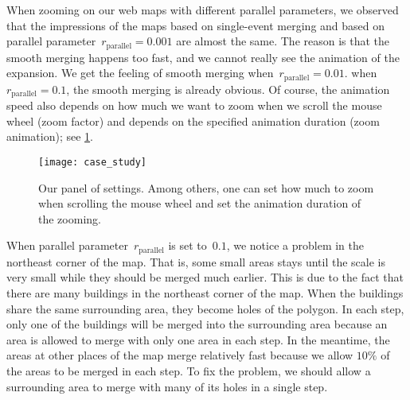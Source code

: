 \documentclass[ijgi,article,submit,moreauthors,pdftex]{Definitions/mdpi}
\begin{document}
\begin{table}[tb]
\label{tbl:parallel_param_comparison}
\end{table}

When zooming on our web maps with different parallel parameters,
we observed that the impressions of the maps 
based on single-event merging and based on parallel parameter~$r_\mathrm{parallel}= 0.001$ are almost the same.
The reason is that the smooth merging happens too fast,
and we cannot really see the animation of the expansion.
We get the feeling of smooth merging when~$r_\mathrm{parallel}= 0.01$.
when~$r_\mathrm{parallel}= 0.1$, the smooth merging is already obvious.
Of course, the animation speed also depends on how much we want to zoom
when we scroll the mouse wheel (zoom factor) 
and depends on the specified animation duration (zoom animation);
see \fig\ref{fig:interaction_settings}.


\begin{figure}[tb]
\centering
\texttt{[image: case\_study]}
\caption{Our panel of settings. 
Among others, one can set how much to zoom when scrolling the mouse wheel 
and set the animation duration of the zooming.}
\label{fig:interaction_settings}
\end{figure}

When parallel parameter~$r_\mathrm{parallel}$ is set to~$0.1$,
we notice a problem in the northeast corner of the map.
That is, some small areas stays until the scale is very small
while they should be merged much earlier.
This is due to the fact that 
there are many buildings in the northeast corner of the map.
When the buildings share the same surrounding area,
they become holes of the polygon.
In each step, only one of the buildings will be merged into the surrounding area
because an area is allowed to merge with only one area in each step.
In the meantime, the areas at other places of the map merge relatively fast
because we allow $10\%$ of the areas to be merged in each step.
To fix the problem, we should allow a surrounding area 
to merge with many of its holes in a single step.
\end{document}
